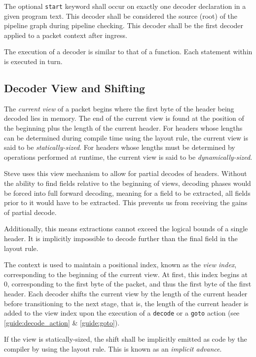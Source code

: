 The optional \texttt{start} keyword shall occur on exactly one decoder declaration in a given program text. This decoder shall be considered the source (root) of the pipeline graph during pipeline checking. This decoder shall be the first decoder applied to a packet context after ingress.

The execution of a decoder is similar to that of a function. Each statement within  is executed in turn.

\subsection{Decoder View and Shifting} \label{guide:decoder_view}

The \textit{current view} of a packet begins where the first byte of the header being decoded lies in memory. The end of the current view is found at the position of the beginning plus the length of the current header. For headers whose lengths can be determined during compile time using the layout rule, the current view is said to be \textit{statically-sized}. For headers whose lengths must be determined by operations performed at runtime, the current view is said to be \textit{dynamically-sized}.

Steve uses this view mechanism to allow for partial decodes of headers. Without the ability to find fields relative to the beginning of views, decoding phases would be forced into full forward decoding, meaning for a field to be extracted, all fields prior to it would have to be extracted. This prevents us from receiving the gains of partial decode.

Additionally, this means extractions cannot exceed the logical bounds of a single header. It is implicitly impossible to decode further than the final field in the layout rule.

The context is used to maintain a positional index, known as the \textit{view index}, corresponding to the beginning of the current view. At first, this index begins at 0, corresponding to the first byte of the packet, and thus the first byte of the first header. Each decoder shifts the current view by the length of the current header before transitioning to the next stage, that is, the length of the current header is added to the view index upon the execution of a \texttt{decode} or a \texttt{goto} action (see \ref{guide:decode_action} \& \ref{guide:goto}).

If the view is statically-sized, the shift shall be implicitly emitted as code by the compiler by using the layout rule. This is known as an \textit{implicit advance}.

